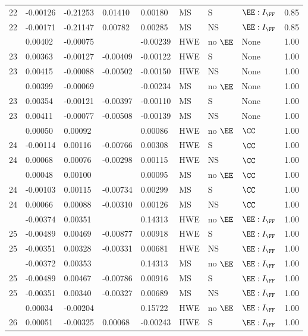 \begin{longtable}[t]{lllllllll}
22 & -0.00126 & -0.21253 & 0.01410 & 0.00180 & MS & S & $\EE:I_{\FF}$ & 0.85\\
22 & -0.00171 & -0.21147 & 0.00782 & 0.00285 & MS & NS & $\EE:I_{\FF}$ & 0.85\\
\addlinespace
23 & 0.00402 & -0.00075 &  & -0.00239 & HWE & no $\EE$ & None & 1.00\\
23 & 0.00363 & -0.00127 & -0.00409 & -0.00122 & HWE & S & None & 1.00\\
23 & 0.00415 & -0.00088 & -0.00502 & -0.00150 & HWE & NS & None & 1.00\\
\addlinespace
23 & 0.00399 & -0.00069 &  & -0.00234 & MS & no $\EE$ & None & 1.00\\
23 & 0.00354 & -0.00121 & -0.00397 & -0.00110 & MS & S & None & 1.00\\
23 & 0.00411 & -0.00077 & -0.00508 & -0.00139 & MS & NS & None & 1.00\\
\addlinespace
24 & 0.00050 & 0.00092 &  & 0.00086 & HWE & no $\EE$ & $\CC$ & 1.00\\
24 & -0.00114 & 0.00116 & -0.00766 & 0.00308 & HWE & S & $\CC$ & 1.00\\
24 & 0.00068 & 0.00076 & -0.00298 & 0.00115 & HWE & NS & $\CC$ & 1.00\\
\addlinespace
24 & 0.00048 & 0.00100 &  & 0.00095 & MS & no $\EE$ & $\CC$ & 1.00\\
24 & -0.00103 & 0.00115 & -0.00734 & 0.00299 & MS & S & $\CC$ & 1.00\\
24 & 0.00066 & 0.00088 & -0.00310 & 0.00126 & MS & NS & $\CC$ & 1.00\\
\addlinespace
25 & -0.00374 & 0.00351 &  & 0.14313 & HWE & no $\EE$ & $\EE:I_{\FF}$ & 1.00\\
25 & -0.00489 & 0.00469 & -0.00877 & 0.00918 & HWE & S & $\EE:I_{\FF}$ & 1.00\\
25 & -0.00351 & 0.00328 & -0.00331 & 0.00681 & HWE & NS & $\EE:I_{\FF}$ & 1.00\\
\addlinespace
25 & -0.00372 & 0.00353 &  & 0.14313 & MS & no $\EE$ & $\EE:I_{\FF}$ & 1.00\\
25 & -0.00489 & 0.00467 & -0.00786 & 0.00916 & MS & S & $\EE:I_{\FF}$ & 1.00\\
25 & -0.00351 & 0.00340 & -0.00327 & 0.00689 & MS & NS & $\EE:I_{\FF}$ & 1.00\\
\addlinespace
26 & 0.00034 & -0.00204 &  & 0.15722 & HWE & no $\EE$ & $\EE:I_{\FF}$ & 1.00\\
26 & 0.00051 & -0.00325 & 0.00068 & -0.00243 & HWE & S & $\EE:I_{\FF}$ & 1.00\\

\end{longtable}
